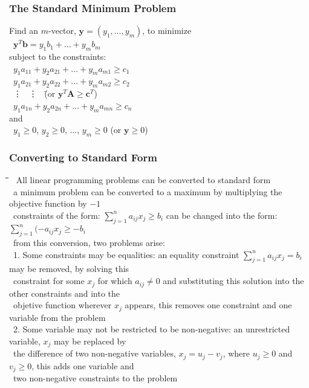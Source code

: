 \documentclass[10pt,letterpaper]{scrartcl}
\newcommand{\tbul}{\textbullet}
\newcommand{\tend}{\>\textendash}
\newcommand{\tabDef}{\hspace{2em}\=\hspace{2em}\=\hspace{2em}\=\hspace{2em}\=\kill}
\begin{document}
\begin{tabbing}
\subsubsection*{The Standard Minimum Problem}\begin{tabbing}
Find an $m$-vector, $\mathbf{y}=(y_1,\ldots , y_m)$, to minimize \= \\
\>\ $\mathbf{y}^T\mathbf{b}=y_1b_1 + \ldots + y_mb_m$ \\
subject to the constraints: \\
\>\ $y_1a_{11} + y_2a_{21} + \ldots + y_ma_{m1} \geq c_1$ \\
\>\ $y_1a_{21} + y_2a_{22} + \ldots + y_ma_{m2} \geq c_2$ \\
\>\ \vdots\ \hspace{12em} \vdots\ \hspace{2em} \=(or $\mathbf{y}^T\mathbf{A}\geq \mathbf{c}^T$)\\
\>\ $y_1a_{1n} + y_2a_{2n} + \ldots + y_ma_{mn} \geq c_n$ \\
and \\
\>\ $y_1 \geq 0$, $y_2 \geq 0$, $\ldots$, $y_m\geq 0$ \> (or $\mathbf{y} \geq 0$)\end{tabbing}
\subsubsection*{Converting to Standard Form}\begin{tabbing}\tabDef
\tbul\ All linear programming problems can be converted to standard form \\
\tbul\ a minimum problem can be converted to a maximum by multiplying the objective function by $-1$\\
    \tend\ constraints of the form: $\displaystyle\sum_{j=1}^{n}a_{ij}x_j\geq b_i$ can be changed into the form: $\displaystyle\sum_{j=1}^{n}(-a_{ij}x_j\geq -b_i$ \\
    \tend\ from this conversion, two problems arise: \\
    \>\>\ 1. Some constraints may be equalities: an equality constraint $\displaystyle\sum_{j=1}^{n}a_{ij}x_j=b_i$ may be removed, by solving this \\ \>\>\ constraint for some $x_j$ for which $a_{ij}\neq 0$ and substituting this solution into the other constraints and into the \\ \>\>\ objetive function wherever $x_j$ appears, this removes one constraint and one variable from the problem \\
    \>\>\ 2. Some variable may not be restricted to be non-negative: an unrestricted variable, $x_j$ may be replaced by \\ \>\>\ the difference of two non-negative variables, $x_j=u_j-v_j$, where $u_j\geq 0$ and $v_j\geq 0$, this adds one variable and \\ \>\>\ two non-negative constraints to the problem \end{tabbing}

\end{tabbing}
\end{document}

